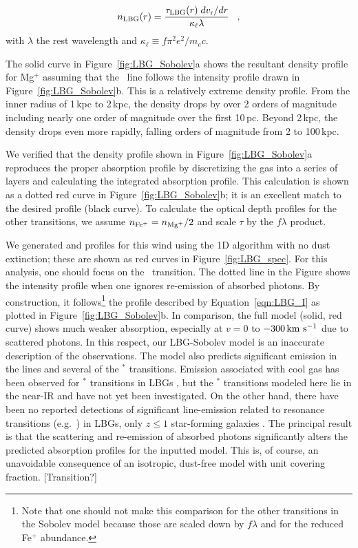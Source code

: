 \documentclass[12pt,preprint]{aastex}
\begin{document}
\begin{equation}
n_{\rm LBG}(r) = \frac{\tau_{\rm LBG}(r) \; dv_{\rm r}/dr}{\kappa_\ell
  \lambda} \;\;\; ,
\label{eqn:Sobolev}
\end{equation}
with $\lambda$ the rest wavelength and $\kappa_\ell \equiv f\pi^2
e^2/m_e c$.  

The solid curve in Figure~\ref{fig:LBG_Sobolev}a shows the
resultant density profile for Mg$^+$ assuming that the \mgiia\ line
follows the intensity profile drawn in Figure~\ref{fig:LBG_Sobolev}b. 
This is a relatively extreme density profile.  From the inner radius
of 1\,kpc to 2\,kpc, the density drops by over 2 orders of
magnitude including nearly one order of magnitude over the first
10\,pc.  Beyond 2\,kpc, the density drops even more rapidly, falling
orders of magnitude from 2 to 100\,kpc.

We verified that the density profile shown in
Figure~\ref{fig:LBG_Sobolev}a
reproduces the proper
absorption profile by discretizing the gas into a series of layers
and calculating the integrated absorption profile.  This
calculation is shown as a dotted red curve in
Figure~\ref{fig:LBG_Sobolev}b; it is an excellent
match to the desired profile (black curve).
To calculate the optical depth profiles for the other transitions, we
assume $n_{\rm Fe^+} = n_{\rm Mg^+}/2$ and scale $\tau$ by the $f\lambda$ product.

We generated  and  profiles for this wind
using the 1D algorithm with no dust extinction; these are shown as
red curves in Figure~\ref{fig:LBG_spec}.   For this analysis, one
should focus on the \mgiia\ transition.  The dotted line in the Figure
shows the intensity profile when one ignores re-emission
of absorbed photons.  By construction, it follows\footnote{Note that
  one should not make this comparison for the other transitions in
  the Sobolev model because those are scaled down by $f\lambda$ and
  for  the reduced Fe$^+$ abundance.} the profile
described by Equation~\ref{eqn:LBG_I} as plotted in
Figure~\ref{fig:LBG_Sobolev}b.   In comparison, the full model (solid,
red curve)
shows much weaker absorption, especially at $v = 0$ to $-300 \, {\rm km~s^{-1}}$
due to scattered photons.
In this respect, our LBG-Sobolev model is an
inaccurate description of the observations. The model
also predicts significant emission in the  lines and several of
the $^*$ transitions.   Emission associated with cool gas
has been observed for $^*$
transitions in LBGs \citep{prs+02,shapley03}, but
the $^*$ transitions
modeled here lie in the near-IR and have not yet been investigated.
On the other hand, there have been no 
reported detections of significant line-emission related to resonance
transitions (e.g.\ ) in LBGs, only $z \le 1$ star-forming galaxies
\citep{wcp+09,rubin09}.  
The principal result is that the scattering and re-emission of
absorbed photons significantly alters the predicted absorption profiles
for the inputted model.  This is, of course, an unavoidable
consequence of an isotropic, dust-free model with unit covering
fraction.
[Transition?]
\end{document}
